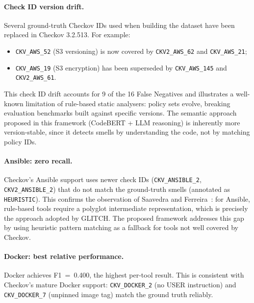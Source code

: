 \documentclass[12pt, a4paper]{report}
\begin{document}
\paragraph{Check ID version drift.}
Several ground-truth Checkov IDs used when building the dataset have been replaced
in Checkov 3.2.513. For example:
\begin{sloppypar}
\begin{itemize}
  \item \texttt{CKV\_AWS\_52} (S3 versioning) is now covered by
        \texttt{CKV2\_AWS\_62} and \texttt{CKV\_AWS\_21};
  \item \texttt{CKV\_AWS\_19} (S3 encryption) has been superseded by
        \texttt{CKV\_AWS\_145} and \texttt{CKV2\_AWS\_61}.
\end{itemize}
\end{sloppypar}
This check ID drift accounts for 9 of the 16 False Negatives and illustrates a
well-known limitation of rule-based static analysers: policy sets evolve, breaking
evaluation benchmarks built against specific versions. The semantic approach proposed
in this framework (CodeBERT + LLM reasoning) is inherently more version-stable,
since it detects smells by understanding the code, not by matching policy IDs.

\paragraph{Ansible: zero recall.}
\begin{sloppypar}
Checkov's Ansible support uses newer check IDs (\texttt{CKV\_ANSIBLE\_2},
\texttt{CKV2\_ANSIBLE\_2}) that do not match the ground-truth
smells (annotated as \texttt{HEURISTIC}). This confirms the observation of
Saavedra and Ferreira~\citep{saavedra2022glitch}: for Ansible, rule-based
tools require a polyglot intermediate representation, which is precisely the
approach adopted by GLITCH. The proposed framework addresses this gap by using
heuristic pattern matching as a fallback for tools not well covered by Checkov.
\end{sloppypar}

\paragraph{Docker: best relative performance.}
Docker achieves F1~=~0.400, the highest per-tool result. This is consistent
with Checkov's mature Docker support:
\texttt{CKV\_DOCKER\_2} (no USER instruction) and
\texttt{CKV\_DOCKER\_7} (unpinned image tag) match the ground truth reliably.
\end{document}

